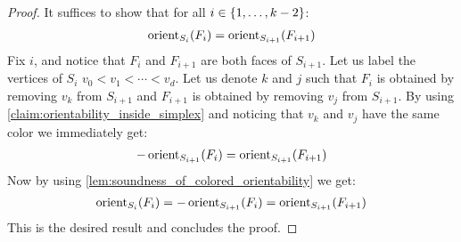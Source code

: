 \begin{proof}
	It suffices to show that for all $i \in \left\{1, \dots, k-2\right\}$:
	\begin{align*}
		\operatorname{orient}_{S_i}(F_i) =  \operatorname{orient}_{S_{i+1}}(F_{i+1})
	\end{align*}
	Fix $i$, and notice that $F_i$ and $F_{i+1}$ are both faces of $S_{i+1}$. Let us label the vertices of $S_i$ $v_0 < v_1 < \cdots < v_d$. Let us denote $k$ and $j$ such that $F_i$ is obtained by removing $v_k$ from $S_{i+1}$ and $F_{i+1}$ is obtained by removing $v_j$ from $S_{i+1}$.
	By using \cref{claim:orientability_inside_simplex} and noticing that $v_k$ and $v_j$ have the same color  we immediately get:
	\begin{align*}
		- \operatorname{orient}_{S_{i+1}}(F_i) =  \operatorname{orient}_{S_{i+1}}(F_{i+1})
	\end{align*}
	Now by using \cref{lem:soundness_of_colored_orientability} we get:
	\begin{align*}
		\operatorname{orient}_{S_i}(F_i) = - \operatorname{orient}_{S_{i+1}}(F_i) =  \operatorname{orient}_{S_{i+1}}(F_{i+1})
	\end{align*}
	This is the desired result and concludes the proof.
\end{proof}

